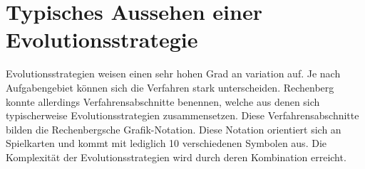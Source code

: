 \section{Typisches Aussehen einer Evolutionsstrategie}
Evolutionsstrategien weisen einen sehr hohen Grad an variation auf. Je nach Aufgabengebiet können sich die Verfahren stark unterscheiden.
Rechenberg konnte allerdings Verfahrensabschnitte benennen, welche aus denen sich typischerweise Evolutionsstrategien zusammensetzen.
Diese Verfahrensabschnitte bilden die Rechenbergsche Grafik-Notation. Diese Notation orientiert sich an Spielkarten und kommt mit lediglich 10 verschiedenen Symbolen aus.
Die Komplexität der Evolutionsstrategien wird durch deren Kombination erreicht.

